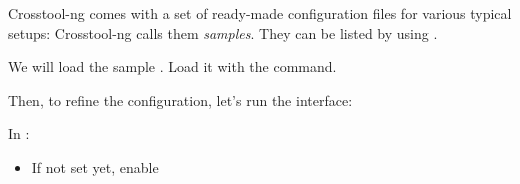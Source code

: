 Crosstool-ng comes with a set of ready-made configuration files for
various typical setups: Crosstool-ng calls them {\em samples}. They can be
listed by using .

We will load the
sample%
. Load it with the 
command.

Then, to refine the configuration, let's run the  interface:


In :
\begin{itemize}
\item If not set yet, enable 
\end{itemize}




